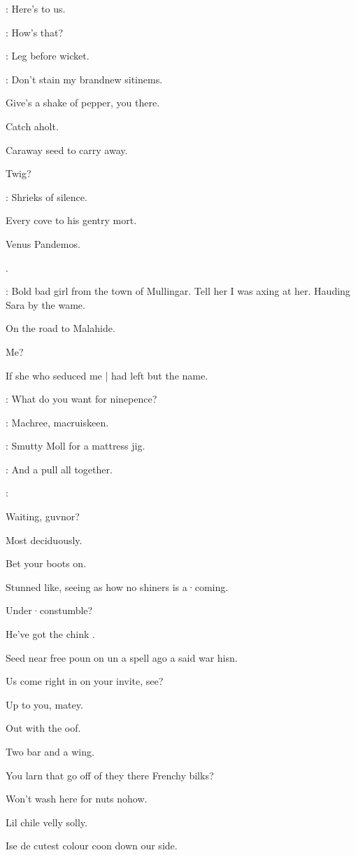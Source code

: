 \dixon:
Here's to us.

\madden:
How's that?

\lynch:
Leg before wicket.

\mulligan:
Don't stain my brandnew sitinems.

Give's a shake of pepper,
you there.

Catch aholt.

Caraway seed to carry away.

Twig?

:
Shrieks of silence.

Every cove to his gentry mort.

Venus Pandemos.

.

\bannon:
Bold bad girl from the town of Mullingar.
Tell her I was axing at her.
Hauding Sara by the wame.

On the road to Malahide.

Me?

If she who seduced me |
had left but the name.

\lenehan:
What do you want for ninepence?

\stephen:
Machree,
macruiskeen.

\lynch:
Smutty Moll for a mattress jig.

\punch:
And a pull all together.

\All:


Waiting,
guvnor?

Most deciduously.

Bet your boots on.

Stunned like,
seeing as how no shiners is a·coming.

Under·constumble?

He've got the chink .

Seed near free poun on un a spell ago a said war hisn.

Us come right in on your invite,
see?

Up to you,
matey.

Out with the oof.

Two bar and a wing.

You larn that go off of they there Frenchy bilks?

Won't wash here for nuts nohow.

Lil chile velly solly.

Ise de cutest colour coon down our side.

